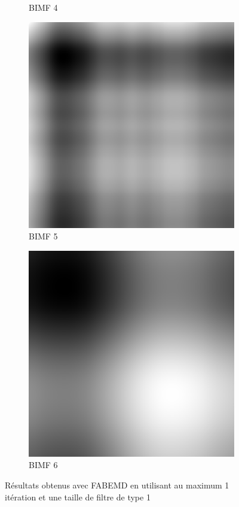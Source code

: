 \begin{figure}
\begin{subfigure}{.30\textwidth}
  \caption{BIMF 4}
\end{subfigure}
\begin{subfigure}{.30\textwidth}
  \centering
  \includegraphics[width=.9\linewidth]{img/s_1_1_5}
  \caption{BIMF 5}
\end{subfigure}
\begin{subfigure}{.30\textwidth}
  \centering
  \includegraphics[width=.9\linewidth]{img/s_1_1_6}
  \caption{BIMF 6}
\end{subfigure}
\caption{Résultats obtenus avec FABEMD en utilisant au maximum 1 itération et une taille de filtre de type 1}
\label{fig:s_1_1}
\end{figure}


